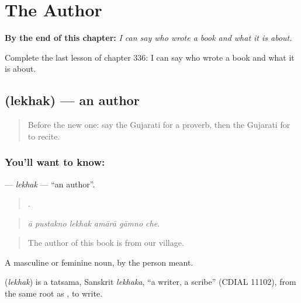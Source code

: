 
\chapter{The Author}
\label{ch:gu-the-author}

\begin{chapteropening}
\textbf{By the end of this chapter:} \emph{I can say who wrote a book and what it is about.}

Complete the last lesson of chapter 336: I can say who wrote a book and what it is about.
\end{chapteropening}

\section[\texorpdfstring{\gu{લેખક} (lekhak)}{લેખક (lekhak)}]{ (lekhak) — an author}

\label{lesson:GU-C336-lekhak}



\begin{quote}
Before the new one: say the Gujarati for a proverb, then the Gujarati for to recite.
\end{quote}

\subsection*{You'll want to know: }
\textbf{} — \emph{lekhak} — \textquotedblleft{}an author\textquotedblright{}.

\begin{quote}
     .
\end{quote}

\begin{quote}
\emph{ā pustakno lekhak amārā gāmno che.}
\end{quote}

\begin{quote}
The author of this book is from our village.
\end{quote}

A masculine or feminine noun, by the person meant.

\begin{cousinweb}
\textbf{} (\emph{lekhak}) is a tatsama, Sanskrit \emph{lekhaka}, \textquotedblleft{}a writer, a scribe\textquotedblright{} (CDIAL 11102), from the same root as \textbf{}, to write.
\end{cousinweb}

